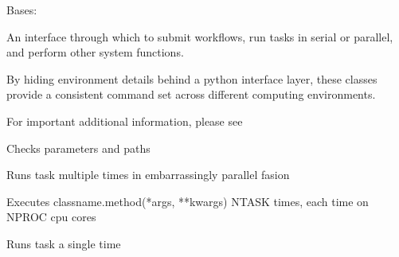 \documentclass[letterpaper,10pt,english]{sphinxmanual}
\begin{document}
\begin{fulllineitems}
\label{\detokenize{ref/seisflows.system:seisflows.system.multicore.multicore}}
Bases: {\hyperref[\detokenize{ref/seisflows.system:seisflows.system.serial.serial}]{}}

An interface through which to submit workflows, run tasks in serial or
parallel, and perform other system functions.

By hiding environment details behind a python interface layer, these
classes provide a consistent command set across different computing
environments.

For important additional information, please see

\begin{fulllineitems}
\label{\detokenize{ref/seisflows.system:seisflows.system.multicore.multicore.check}}
Checks parameters and paths

\end{fulllineitems}


\begin{fulllineitems}
\label{\detokenize{ref/seisflows.system:seisflows.system.multicore.multicore.run}}
Runs task multiple times in embarrassingly parallel fasion

Executes classname.method(*args, **kwargs) NTASK times, each time on
NPROC cpu cores

\end{fulllineitems}


\begin{fulllineitems}
\label{\detokenize{ref/seisflows.system:seisflows.system.multicore.multicore.run_single}}
Runs task a single time


\end{fulllineitems}
\end{fulllineitems}
\end{document}
